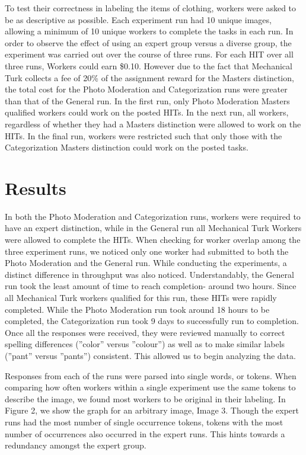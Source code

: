 \documentclass{chi2012}
\newcommand{\tab}{\hspace*{2em}}
\begin{document}
\tab To test their correctness in labeling the items of clothing, workers were asked to be as descriptive as possible. Each experiment run had 10 unique images, allowing a minimum of 10 unique workers to complete the tasks in each run. In order to observe the effect of using an expert group versus a diverse group, the experiment was carried out over the course of three runs. For each HIT over all three runs, Workers could earn \$0.10. However due to the fact that Mechanical Turk collects a fee of 20\% of the assignment reward for the Masters distinction, the total cost for the Photo Moderation and Categorization runs were greater than that of the General run. In the first run, only Photo Moderation Masters qualified workers could work on the posted HITs. In the next run, all workers, regardless of whether they had a Masters distinction were allowed to work on the HITs. In the final run, workers were restricted such that only those with the Categorization Masters distinction could work on the posted tasks. 

\section{Results}
\tab In both the Photo Moderation and Categorization runs, workers were required to have an expert distinction, while in the General run all Mechanical Turk Workers were allowed to complete the HITs. When checking for worker overlap among the three experiment runs, we noticed only one worker had submitted to both the Photo Moderation and the General run. While conducting the experiments, a distinct difference in throughput was also noticed. Understandably, the General run took the least amount of time to reach completion- around two hours. Since all Mechanical Turk workers qualified for this run, these HITs were rapidly completed. While the Photo Moderation run took around 18 hours to be completed, the Categorization run took 9 days to successfully run to completion. Once all the responses were received, they were reviewed manually to correct spelling differences (''color'' versus ''colour'') as well as to make similar labels (''pant'' versus ''pants'') consistent. This allowed us to begin analyzing the data.

\tab Responses from each of the runs were parsed into single words, or tokens. When comparing how often workers within a single experiment use the same tokens to describe the image, we found most workers to be original in their labeling. In Figure 2, we show the graph for an arbitrary image, Image 3. Though the expert runs had the most number of single occurrence tokens, tokens with the most number of occurrences also occurred in the expert runs. This hints towards a redundancy amongst the expert group.
 
\end{document}
